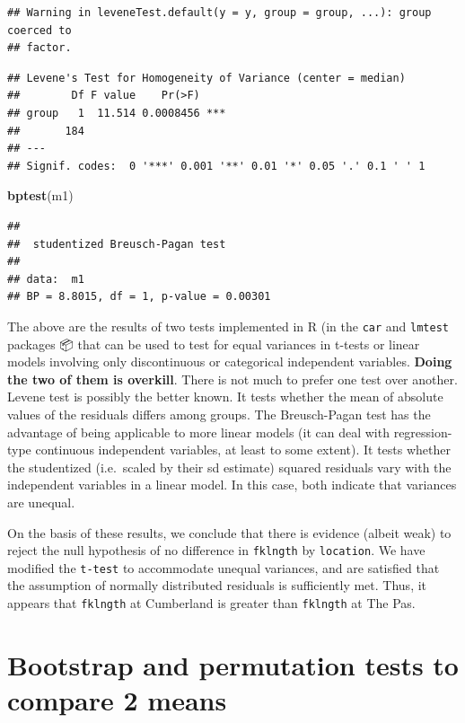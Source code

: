 \documentclass[
  12pt,
]{book}
\newenvironment{Shaded}{\begin{snugshade}}{\end{snugshade}}
\newcommand{\KeywordTok}[1]{\textcolor[rgb]{0.13,0.29,0.53}{\textbf{#1}}}
\newcommand{\NormalTok}[1]{#1}
\begin{document}
\begin{verbatim}
## Warning in leveneTest.default(y = y, group = group, ...): group coerced to
## factor.
\end{verbatim}

\begin{verbatim}
## Levene's Test for Homogeneity of Variance (center = median)
##        Df F value    Pr(>F)    
## group   1  11.514 0.0008456 ***
##       184                      
## ---
## Signif. codes:  0 '***' 0.001 '**' 0.01 '*' 0.05 '.' 0.1 ' ' 1
\end{verbatim}

\begin{Shaded}
\begin{Highlighting}[]
\KeywordTok{bptest}\NormalTok{(m1)}
\end{Highlighting}
\end{Shaded}

\begin{verbatim}
## 
##  studentized Breusch-Pagan test
## 
## data:  m1
## BP = 8.8015, df = 1, p-value = 0.00301
\end{verbatim}

The above are the results of two tests implemented in R (in the \texttt{car} and \texttt{lmtest} packages 📦 that can be used to test for equal variances in t-tests or linear models involving only discontinuous or categorical independent variables. \textbf{Doing the two of them is overkill}. There is not much to prefer one test over another. Levene test is possibly the
better known. It tests whether the mean of absolute values of the residuals differs among groups. The Breusch-Pagan test has the advantage of being applicable to more linear models (it can deal with regression-type continuous independent variables, at least to some extent). It tests whether the studentized (i.e.~scaled by their sd estimate) squared residuals vary with the independent variables in a linear model. In this case, both indicate that variances are unequal.

On the basis of these results, we conclude that there is evidence (albeit weak) to reject the null hypothesis of no difference in \texttt{fklngth} by \texttt{location}. We have modified the \texttt{t-test} to accommodate unequal variances, and are satisfied that the assumption of normally distributed residuals is sufficiently met. Thus, it appears that \texttt{fklngth} at Cumberland is greater than \texttt{fklngth} at The Pas.

\hypertarget{bootstrap-and-permutation-tests-to-compare-2-means}{%
\section{Bootstrap and permutation tests to compare 2 means}\label{bootstrap-and-permutation-tests-to-compare-2-means}}
\end{document}
